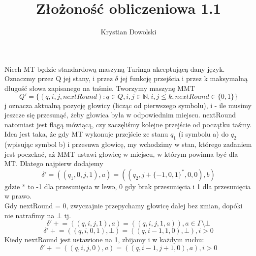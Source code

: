 \documentclass{article}
\title{Złożoność obliczeniowa 1.1}
\author{Krystian Dowolski}
\newcommand{\pluseq}{\mathrel{+}=}
\begin{document}
	\maketitle
    Niech MT będzie standardową maszyną Turinga akceptującą dany język. Oznaczmy przez Q jej stany, i przez $\delta$
    jej funkcję przejścia i przez k maksymalną długość słowa zapisanego na taśmie. Tworzymy maszynę MMT
    $$ Q' = \{(q, i, j, nextRound): q\in Q, i,j\in \mathbb{N}, i,j\leq k, nextRound\in \{0,1\}\}$$
    j oznacza aktualną pozycję głowicy (licząc od pierwszego symbolu), i - ile musimy jeszcze się przesunąć, żeby
    głowica była w odpowiednim miejscu. nextRound natomiast jest flagą mówiącą, czy zaczęliśmy kolejne przejście od
    początku taśmy.\\
    Idea jest taka, że gdy MT wykonuje przejście ze stanu $q_1$ (i symbolu a) do $q_2$ (wpisując symbol b) i przesuwa głowicę,
    my wchodzimy w stan, którego zadaniem jest poczekać, aż MMT ustawi głowicę w miejscu, w którym powinna być dla MT. Dlatego najpierw
    dodajemy
    $$\delta' = ((q_1, 0, j, 1), a) = ((q_2, j+\{-1,0,1\}^*, 0, 0), b)$$
    gdzie * to -1 dla przesunięcia w lewo, 0 gdy brak przesunięcia i 1 dla przesunięcia w prawo.\\
    Gdy nextRound = 0, zwyczajnie przepychamy głowicę dalej bez zmian, dopóki nie natrafimy na $\bot$ tj.
    $$\delta' \pluseq((q, i, j, 1), a) = ((q, i, j, 1, a)), a\in \Gamma \setminus \bot $$
    $$\delta' \pluseq ((q, i, 0, 1), \bot) = ((q, i-1, 1, 0), \bot), i > 0$$
    Kiedy nextRound jest ustawione na 1, zbijamy i w każdym ruchu:
    $$\delta' \pluseq ((q, i, j, 0), a) = ((q, i-1, j+1, 0), a), i > 0 $$
\end{document}
